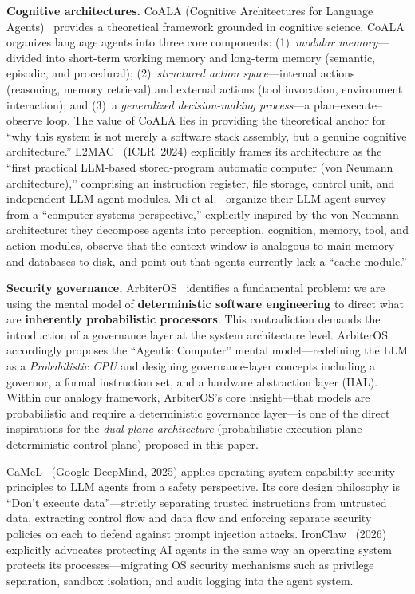 \documentclass[11pt,a4paper]{article}
\begin{document}
\textbf{Cognitive architectures.}
CoALA (Cognitive Architectures for Language Agents)~\cite{sumers2024coala} provides a theoretical framework grounded in cognitive science.
CoALA organizes language agents into three core components:
(1)~\textit{modular memory}---divided into short-term working memory and long-term memory (semantic, episodic, and procedural);
(2)~\textit{structured action space}---internal actions (reasoning, memory retrieval) and external actions (tool invocation, environment interaction); and
(3)~a \textit{generalized decision-making process}---a plan--execute--observe loop.
The value of CoALA lies in providing the theoretical anchor for ``why this system is not merely a software stack assembly, but a genuine cognitive architecture.''
L2MAC~\cite{holt2024l2mac} (ICLR~2024) explicitly frames its architecture as the ``first practical LLM-based stored-program automatic computer (von Neumann architecture),'' comprising an instruction register, file storage, control unit, and independent LLM agent modules.
Mi et al.~\cite{mi2025llmagentscomputersystems} organize their LLM agent survey from a ``computer systems perspective,'' explicitly inspired by the von Neumann architecture: they decompose agents into perception, cognition, memory, tool, and action modules, observe that the context window is analogous to main memory and databases to disk, and point out that agents currently lack a ``cache module.''

\textbf{Security governance.}
ArbiterOS~\cite{arbiteros2025} identifies a fundamental problem: we are using the mental model of \textbf{deterministic software engineering} to direct what are \textbf{inherently probabilistic processors}.
This contradiction demands the introduction of a governance layer at the system architecture level.
ArbiterOS accordingly proposes the ``Agentic Computer'' mental model---redefining the LLM as a \textit{Probabilistic CPU} and designing governance-layer concepts including a governor, a formal instruction set, and a hardware abstraction layer (HAL).
Within our analogy framework, ArbiterOS's core insight---that models are probabilistic and require a deterministic governance layer---is one of the direct inspirations for the \textit{dual-plane architecture} (probabilistic execution plane + deterministic control plane) proposed in this paper.

CaMeL~\cite{debenedetti2025camel} (Google DeepMind, 2025) applies operating-system capability-security principles to LLM agents from a safety perspective.
Its core design philosophy is ``Don't execute data''---strictly separating trusted instructions from untrusted data, extracting control flow and data flow and enforcing separate security policies on each to defend against prompt injection attacks.
IronClaw~\cite{ironclaw2025} (2026) explicitly advocates protecting AI agents in the same way an operating system protects its processes---migrating OS security mechanisms such as privilege separation, sandbox isolation, and audit logging into the agent system.
\end{document}
